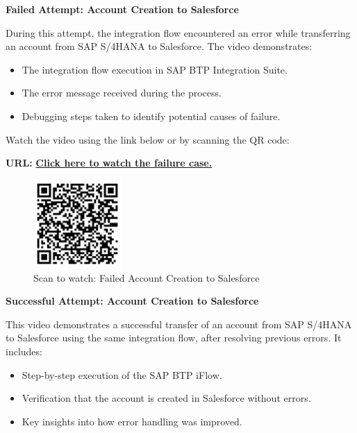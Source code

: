 \bigskip

\noindent\textbf{Failed Attempt: Account Creation to Salesforce}  

\noindent During this attempt, the integration flow encountered an error while transferring an account from SAP S/4HANA to Salesforce. The video demonstrates:
\begin{itemize}
    \item The integration flow execution in SAP BTP Integration Suite.
    \item The error message received during the process.
    \item Debugging steps taken to identify potential causes of failure.
\end{itemize}

\noindent Watch the video using the link below or by scanning the QR code:

\noindent \textbf{URL:} \href{https://drive.google.com/file/d/1qYmTXes5Tejw8vLCC0j5ul4r7GYKo6Hq/view?usp=drive_link}{\textbf{Click here to watch the failure case.}}

\begin{figure}[h]
    \centering
    \includegraphics[width=0.3\textwidth]{Appendix/images/Fail_QR.png} %
    \caption{Scan to watch: Failed Account Creation to Salesforce}
    \label{fig:failed_video}
\end{figure}

\bigskip

\noindent\textbf{Successful Attempt: Account Creation to Salesforce}  

\noindent This video demonstrates a successful transfer of an account from SAP S/4HANA to Salesforce using the same integration flow, after resolving previous errors. It includes:
\begin{itemize}
    \item Step-by-step execution of the SAP BTP iFlow.
    \item Verification that the account is created in Salesforce without errors.
    \item Key insights into how error handling was improved.
\end{itemize}


